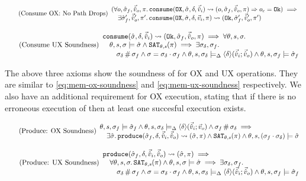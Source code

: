 \begin{equation}
\tag{Consume OX: No Path Drops}\label{eq:consume-ox-no-drop}
\begin{array}{l}
(\forall o, \hat{\sigma}_f,\vec{\hat{v}}_o,\pi \ldotp \texttt{consume}(\texttt{OX},\hat{\sigma},\delta,\vec{\hat{v}}_i)\rightsquigarrow (o, \hat{\sigma}_f, \vec{\hat{v}}_o, \pi)\Rightarrow o_c = \texttt{Ok}) \implies \\
\quad \exists  \hat{\sigma}_f',\vec{\hat{v}}_o',\pi' \ldotp \texttt{consume}(\texttt{OX}, \hat{\sigma}, \delta,\vec{v}_i,\pi)\rightsquigarrow (\texttt{Ok}, \hat{\sigma}_f', \vec{\hat{v}}_o', \pi')
\end{array}
\end{equation}

\begin{equation}
\tag{Consume UX Soundness}\label{eq:consume-ux-sound}
\begin{array}{l}
\texttt{consume}(\hat{\sigma},\delta,\vec{\hat{v}}_i)\rightsquigarrow (\texttt{Ok},\hat{\sigma}_f,\vec{\hat{v}}_o,\pi) \implies \forall \theta,s,\sigma\ldotp \\
\quad  \theta,s,\sigma\models \hat{\sigma} \land \texttt{SAT}_{\mathit{\theta,s}}(\pi) \implies \exists \sigma_\delta, \sigma_f\ldotp\\
\qquad \sigma_\delta\operatorname{\#}\sigma_f \land \sigma=\sigma_\delta\cdot\sigma_f \land \theta, s, \sigma_\delta \models_{\Delta} \left<\delta\right>\!(\vec{\hat{v}}_i;\vec{\hat{v}}_o) \land \theta,s,\sigma_f\models \hat{\sigma}_f
\end{array}
\end{equation}

The above three axioms show the soundness of \consume{} for OX and UX operations. They are similar to \ref{eq:mem-ox-soundness} and \ref{eq:mem-ux-soundness} respectively. We also have an additional requirement for OX execution, stating that if there is no erroneous execution of \consume{} then at least one succesful execution exists.

\begin{equation}
\tag{Produce: OX Soundness}\label{eq:produce-ox-sound}
\begin{array}{l}
\theta, s, \sigma_f \models \hat{\sigma}_f \land \theta, s, \sigma_\delta \models_{\Delta} \left<\delta\right>\!(\vec{\hat{v}}_i;\vec{v}_o) \land \sigma_f\operatorname{\#}\sigma_\delta \implies \\
\quad \exists \hat{\sigma}\ldotp \texttt{produce}(\hat{\sigma}_f,\delta,\vec{\hat{v}}_i,\vec{\hat{v}}_o)\rightsquigarrow (\hat{\sigma},\pi) \land \texttt{SAT}_{\mathit{\theta,s}}(\pi) \land \theta,s,(\sigma_f\cdot\sigma_\delta) \models \hat{\sigma}
\end{array}
\end{equation}

\begin{equation}
\tag{Produce: UX Soundness}\label{eq:produce-ux-sound}
\begin{array}{l}
\texttt{produce}(\hat{\sigma}_f,\delta,\vec{\hat{v}}_i,\vec{\hat{v}}_o)\rightsquigarrow (\hat{\sigma}, \pi) \implies\\
\quad \forall\theta,s,\sigma\ldotp \texttt{SAT}_{\mathit{\theta,s}}(\pi) \land \theta,s,\sigma\models\hat{\sigma} \implies \exists \sigma_\delta, \sigma_f\ldotp \\
\qquad \sigma_\delta\operatorname{\#}\sigma_f \land \sigma=\sigma_\delta\cdot\sigma_f \land \theta,s,\sigma_\delta \models_{\Delta} \left<\delta\right>\!(\vec{\hat{v}}_i;\vec{\hat{v}}_o) \land \theta,s,\sigma_f \models \hat{\sigma}_f
\end{array}
\end{equation}

